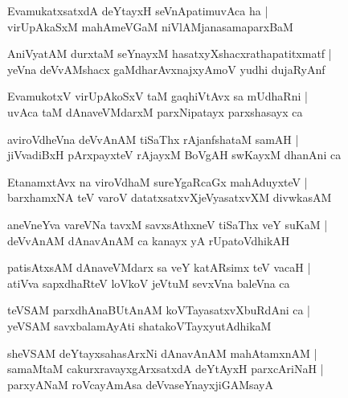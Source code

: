 \begin{shloka}
EvamukatxsatxdA deYtayxH seVnApatimuvAca ha |\\
virUpAkaSxM mahAmeVGaM niVlAMjanasamaparxBaM
\end{shloka}

\begin{shloka}
AniVyatAM durxtaM seYnayxM hasatxyXshacxrathapatitxmatf |\\
yeVna deVvAMshacx gaMdharAvxnajxyAmoV yudhi dujaRyAnf 
\end{shloka}

\begin{shloka}
EvamukotxV virUpAkoSxV taM gaqhiVtAvx sa mUdhaRni |\\
uvAca taM dAnaveVMdarxM parxNipatayx parxshasayx ca 
\end{shloka}

\begin{shloka}
aviroVdheVna deVvAnAM tiSaThx rAjanfshataM samAH |\\
jiVvadiBxH pArxpayxteV rAjayxM BoVgAH swKayxM dhanAni ca 
\end{shloka}

\begin{shloka}
EtanamxtAvx na viroVdhaM sureYgaRcaGx mahAduyxteV |\\
barxhamxNA teV varoV datatxsatxvXjeVyasatxvXM divwkasAM 
\end{shloka}

\begin{shloka}
aneVneYva vareVNa tavxM savxsAthxneV tiSaThx veY suKaM |\\
deVvAnAM dAnavAnAM ca kanayx yA rUpatoVdhikAH
\end{shloka}

\begin{shloka}
patisAtxsAM dAnaveVMdarx sa veY katARsimx teV vacaH |\\
atiVva sapxdhaRteV loVkoV jeVtuM sevxVna baleVna ca 
\end{shloka}

\begin{shloka}
teVSAM parxdhAnaBUtAnAM koVTayasatxvXbuRdAni ca |\\
yeVSAM savxbalamAyAti shatakoVTayxyutAdhikaM 
\end{shloka}

\begin{shloka}
sheVSAM deYtayxsahasArxNi dAnavAnAM mahAtamxnAM |\\
samaMtaM cakurxravayxgArxsatxdA deYtAyxH parxcAriNaH |\\
parxyANaM roVcayAmAsa deVvaseYnayxjiGAMsayA 
\end{shloka}

